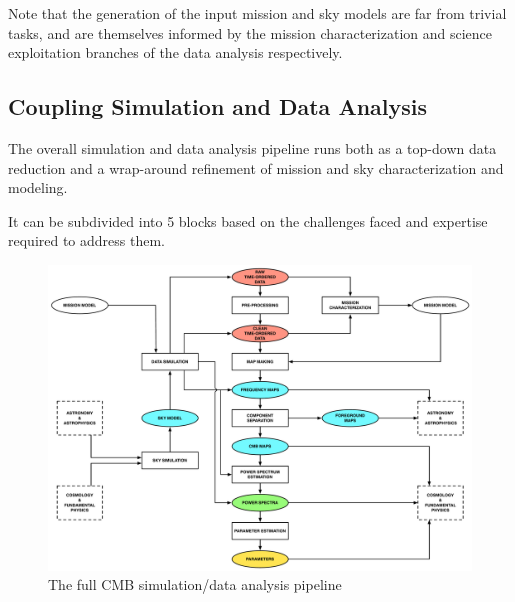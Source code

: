 Note that the generation of the input mission and sky models are far from trivial tasks, and are themselves informed by the mission characterization and science exploitation branches of the data analysis respectively.

\newpage

\subsection{Coupling Simulation and Data Analysis}

The overall simulation and data analysis pipeline runs both as a top-down data reduction and a wrap-around refinement of mission and sky characterization and modeling.

It can be subdivided into 5 blocks based on the challenges faced and expertise required to address them.

\begin{figure}[htbp]
\centering
\includegraphics[width=1\textwidth]{Analysis/simda}
\caption{The full CMB simulation/data analysis pipeline}
\label{default}

\end{figure}

\newpage



\newpage



\newpage



\newpage



\newpage



\newpage

%



